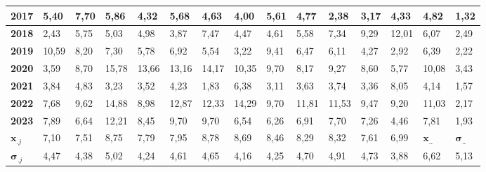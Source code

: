 \begin{tabular}{|l|l|l|l|l|l|l|l|l|l|l|l|l|l|l|}
    \textbf{2017} & 5,40 & 7,70 & 5,86 & 4,32 & 5,68 & 4,63 & 4,00 & 5,61 & 4,77 & 2,38 & 3,17 & 4,33 & 4,82 & 1,32 \\ \hline
    \textbf{2018} & 2,43 & 5,75 & 5,03 & 4,98 & 3,87 & 7,47 & 4,47 & 4,61 & 5,58 & 7,34 & 9,29 & 12,01 & 6,07 & 2,49 \\ \hline
    \textbf{2019} & 10,59 & 8,20 & 7,30 & 5,78 & 6,92 & 5,54 & 3,22 & 9,41 & 6,47 & 6,11 & 4,27 & 2,92 & 6,39 & 2,22 \\ \hline
    \textbf{2020} & 3,59 & 8,70 & 15,78 & 13,66 & 13,16 & 14,17 & 10,35 & 9,70 & 8,17 & 9,27 & 8,60 & 5,77 & 10,08 & 3,43 \\ \hline
    \textbf{2021} & 3,84 & 4,83 & 3,23 & 3,52 & 4,23 & 1,83 & 6,38 & 3,11 & 3,63 & 3,74 & 3,36 & 8,05 & 4,14 & 1,57 \\ \hline
    \textbf{2022} & 7,68 & 9,62 & 14,88 & 8,98 & 12,87 & 12,33 & 14,29 & 9,70 & 11,81 & 11,53 & 9,47 & 9,20 & 11,03 & 2,17 \\ \hline
    \textbf{2023} & 7,89 & 6,64 & 12,21 & 8,45 & 9,70 & 9,70 & 6,54 & 6,26 & 6,91 & 7,70 & 7,26 & 4,46 & 7,81 & 1,93 \\ \hline
    \textbf{$\bm{x}_{.j}$} & 7,10 & 7,51 & 8,75 & 7,79 & 7,95 & 8,78 & 8,69 & 8,46 & 8,29 & 8,32 & 7,61 & 6,99 & $\bm{x}_{..}$ & $\bm{\sigma}_{..}$ \\ \hline
    \textbf{$\bm{\sigma}_{.j}$} & 4,47 & 4,38 & 5,02 & 4,24 & 4,61 & 4,65 & 4,16 & 4,25 & 4,70 & 4,91 & 4,73 & 3,88 & 6,62 & 5,13 \\ \hline
\end{tabular}
